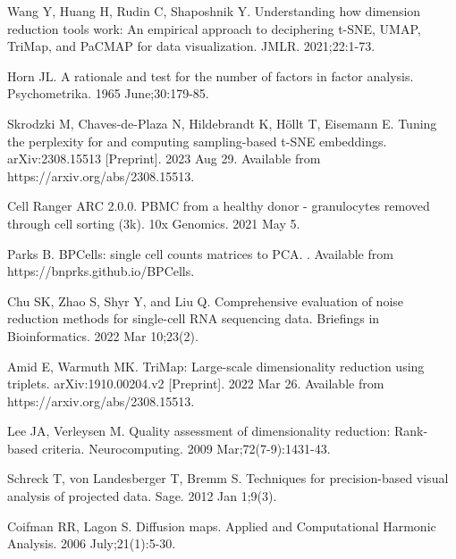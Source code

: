 \documentclass[10pt,letterpaper]{article}
\begin{document}
\begin{thebibliography}{10}
Wang Y, Huang H, Rudin C, Shaposhnik Y.
\newblock Understanding how dimension reduction tools work: An empirical approach to deciphering t-SNE, UMAP, TriMap, and PaCMAP for data visualization.
\newblock JMLR. 2021;22:1-73.

Horn JL.
\newblock A rationale and test for the number of factors in factor analysis.
\newblock Psychometrika. 1965 June;30:179-85.

Skrodzki M, Chaves-de-Plaza N, Hildebrandt K, H\"ollt T, Eisemann E.
\newblock Tuning the perplexity for and computing sampling-based t-SNE embeddings.
\newblock arXiv:2308.15513 [Preprint]. 2023 Aug 29. Available from https://arxiv.org/abs/2308.15513.

Cell Ranger ARC 2.0.0.
\newblock PBMC from a healthy donor - granulocytes removed through cell sorting (3k).
\newblock 10x Genomics. 2021 May 5.

Parks B.
\newblock BPCells: single cell counts matrices to PCA.
. Available from https://bnprks.github.io/BPCells.

Chu SK, Zhao S, Shyr Y, and Liu Q.
\newblock Comprehensive evaluation of noise reduction methods for single-cell RNA sequencing data.
\newblock Briefings in Bioinformatics. 2022 Mar 10;23(2).

Amid E, Warmuth MK. 
\newblock TriMap: Large-scale dimensionality reduction using triplets. 
\newblock arXiv:1910.00204.v2 [Preprint]. 2022 Mar 26. Available from https://arxiv.org/abs/2308.15513.

Lee JA, Verleysen M.
\newblock Quality assessment of dimensionality reduction: Rank-based criteria.
\newblock Neurocomputing. 2009 Mar;72(7-9):1431-43.

Schreck T, von Landesberger T, Bremm S.
\newblock Techniques for precision-based visual analysis of projected data.
\newblock Sage. 2012 Jan 1;9(3).

Coifman RR, Lagon S.
\newblock Diffusion maps.
\newblock Applied and Computational Harmonic Analysis. 2006 July;21(1):5-30.

\end{thebibliography}
\end{document}
